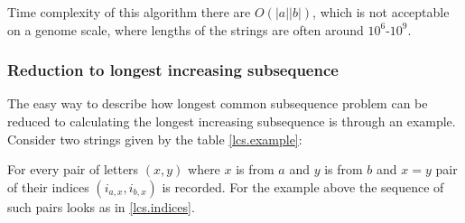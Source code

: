 \documentclass[times, utf8, diplomski]{fer}
\begin{document}
Time complexity of this algorithm there are $O(|a||b|)$, which is not acceptable on a genome scale, where lengths of the strings are often around $10^6$-$10^9$.

\subsubsection{Reduction to longest increasing subsequence}

The easy way to describe how longest common subsequence problem can be reduced to calculating the longest increasing subsequence is through an example. Consider two strings given by the table \ref{lcs.example}:

\begin{table}[H]
  \centering


  \caption{Example strings}\label{lcs.example}
\end{table}

For every pair of letters $(x,y)$ where $x$ is from $a$ and $y$ is from $b$ and $x=y$ pair of their indices $(i_{a,x}, i_{b,x})$ is recorded. For the example above the sequence of such pairs looks as in \ref{lcs.indices}.
\end{document}
